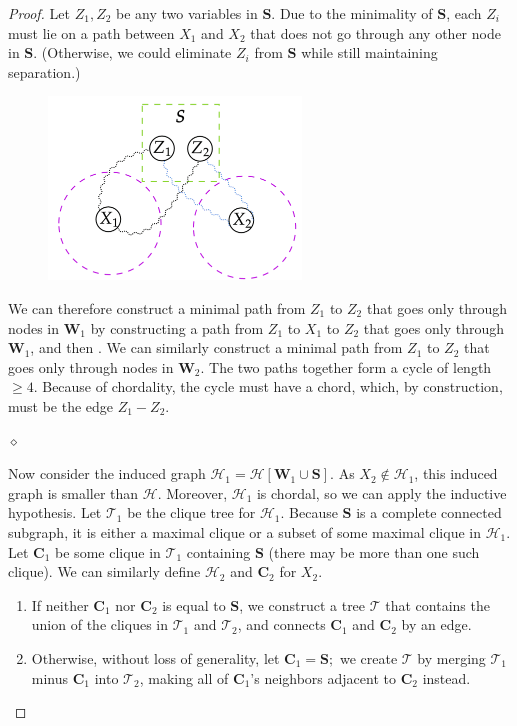 \documentclass{article}
\begin{document}
\begin{proof}
 Let $Z_{1}, Z_{2}$ be any two variables in $\boldsymbol{S}$. Due to the minimality of $\boldsymbol{S}$, each $Z_{i}$ must lie on a path between $X_{1}$ and $X_{2}$ that does not go through any other node in $\boldsymbol{S}$. (Otherwise, we could eliminate $Z_{i}$ from $\boldsymbol{S}$ while still maintaining separation.)
 \begin{figure}[H]
    \centering
    \includegraphics[width=0.6\textwidth]{Figs/a23.png}
\end{figure}
 We can therefore construct a minimal path from $Z_{1}$ to $Z_{2}$ that goes only through nodes in $\boldsymbol{W}_{1}$ by constructing a path from $Z_{1}$ to $X_{1}$ to $Z_{2}$ that goes only through $\boldsymbol{W}_{1}$, and then . We can similarly construct a minimal path from $Z_{1}$ to $Z_{2}$ that goes only through nodes in $\boldsymbol{W}_{2}$. The two paths together form a cycle of length $\geq 4 .$ Because of chordality, the cycle must have a chord, which, by construction, must be the edge $Z_{1}-Z_{2}$.

$\diamond$ 

Now consider the induced graph $\mathcal{H}_{1}=\mathcal{H}\left[\boldsymbol{W}_{1} \cup \boldsymbol{S}\right] .$ As $X_{2} \notin \mathcal{H}_{1}$, this induced graph is smaller than $\mathcal{H} .$ Moreover, $\mathcal{H}_{1}$ is chordal, so we can apply the inductive hypothesis. Let $\mathcal{T}_{1}$ be the clique tree for $\mathcal{H}_{1}$. Because $\boldsymbol{S}$ is a complete connected subgraph, it is either a maximal clique or a subset of some maximal clique in $\mathcal{H}_{1}$. Let $\boldsymbol{C}_{1}$ be some clique in $\mathcal{T}_{1}$ containing $\boldsymbol{S}$ (there may be more than one such clique). We can similarly define $\mathcal{H}_{2}$ and $\boldsymbol{C}_{2}$ for $X_{2} .$ 
\begin{enumerate}
    \item If neither $\boldsymbol{C}_{1}$ nor $\boldsymbol{C}_{2}$ is equal to $\boldsymbol{S}$, we construct a tree $\mathcal{T}$ that contains the union of the cliques in $\mathcal{T}_{1}$ and $\mathcal{T}_{2}$, and connects $\boldsymbol{C}_{1}$ and $\boldsymbol{C}_{2}$ by an edge. 
    \item Otherwise, without loss of generality, let $\boldsymbol{C}_{1}=\boldsymbol{S} ;$ we create $\mathcal{T}$ by merging $\mathcal{T}_{1}$ minus $\boldsymbol{C}_{1}$ into $\mathcal{T}_{2}$, making all of $\boldsymbol{C}_{1}$'s neighbors adjacent to $\boldsymbol{C}_{2}$ instead.
\end{enumerate}


\end{proof}
\end{document}

